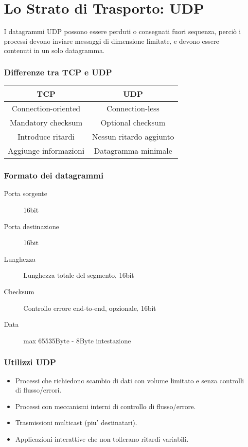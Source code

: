 \chapter{Lo Strato di Trasporto: UDP}
I datagrammi UDP possono essere perduti o consegnati fuori sequenza, perciò i processi devono inviare messaggi di dimensione limitate, e devono essere contenuti in un solo datagramma.
\subsection{Differenze tra TCP e UDP}
\begin{tabular}{|c|c|}
    \hline
    TCP & UDP\\
    \hline
    Connection-oriented & Connection-less\\
    Mandatory checksum & Optional checksum\\
    Introduce ritardi & Nessun ritardo aggiunto\\
    Aggiunge informazioni & Datagramma minimale\\
    \hline
\end{tabular}
\subsection{Formato dei datagrammi}
\begin{description}
    \item[Porta sorgente] 16bit
    \item[Porta destinazione] 16bit
    \item[Lunghezza] Lunghezza totale del segmento, 16bit
    \item[Checksum] Controllo errore end-to-end, opzionale, 16bit
    \item[Data] max 65535Byte - 8Byte intestazione
\end{description}
\subsection{Utilizzi UDP}
\begin{itemize}
    \item Processi che richiedono scambio di dati con volume limitato e senza controlli di flusso/errori.
    \item Processi con meccanismi interni di controllo di flusso/errore.
    \item Trasmissioni multicast (piu' destinatari).
    \item Applicazioni interattive che non tollerano ritardi variabili.
\end{itemize}
